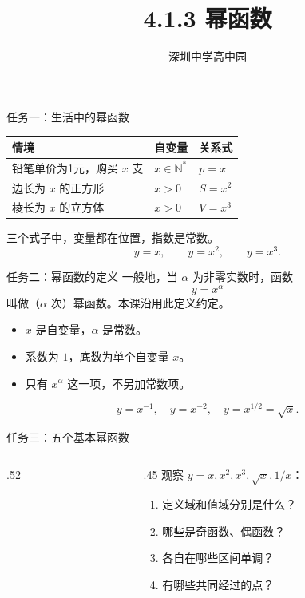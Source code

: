 \documentclass[aspectratio=169,10pt]{beamer}
\title{4.1.3 幂函数}
\author{深圳中学高中园}
\date{}
\begin{document}
\campusmaketitle

\begin{frame}[t]{任务一：生活中的幂函数}
 \renewcommand{\arraystretch}{1.65}
 \centering
 \begin{tabular}{lll}
  \toprule 情境 & 自变量 & 关系式\\\midrule
  铅笔单价为1元，购买 $x$ 支 & $x\in\mathbb N^*$ & $p=x$\\
  边长为 $x$ 的正方形 & $x>0$ & $S=x^2$\\
  棱长为 $x$ 的立方体 & $x>0$ & $V=x^3$\\\bottomrule
 \end{tabular}
 \pause
 \gap
 三个式子中，变量都在位置，指数是常数。
 \[y=x,\qquad y=x^2,\qquad y=x^3.\]
\end{frame}

\begin{frame}[t]{任务二：幂函数的定义}
 一般地，当 $\alpha$ 为非零实数时，函数
 \[\boxed{y=x^\alpha}\]
 叫做（$\alpha$ 次）幂函数。本课沿用此定义约定。
 \pause
 \begin{itemize}
  \item $x$ 是自变量，$\alpha$ 是常数。
  \item 系数为 $1$，底数为单个自变量 $x$。
  \item 只有 $x^\alpha$ 这一项，不另加常数项。
 \end{itemize}
 \[y=x^{-1},\quad y=x^{-2},\quad y=x^{1/2}=\sqrt x.\]
\end{frame}

\begin{frame}[t]{任务三：五个基本幂函数}
 \begin{columns}[T,onlytextwidth]
  \begin{column}{.52\textwidth}\centering\fivepowers\end{column}
  \begin{column}{.45\textwidth}
   观察 $y=x,x^2,x^3,\sqrt x,1/x$：
   \begin{enumerate}
    \item 定义域和值域分别是什么？
    \item 哪些是奇函数、偶函数？
    \item 各自在哪些区间单调？
    \item 有哪些共同经过的点？
   \end{enumerate}
  \end{column}
 \end{columns}
\end{frame}
\end{document}
